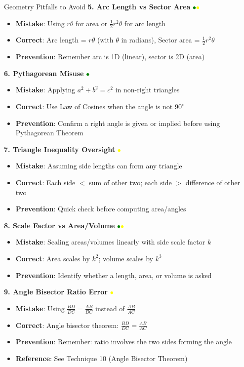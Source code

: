 \documentclass{article}
\begin{document}
\begin{trapbox}{Geometry Pitfalls to Avoid}
\textbf{5. Arc Length vs Sector Area} \textcolor{green}{$\bullet$}\textcolor{yellow}{$\bullet$}
\begin{itemize}[nosep]
\item \textbf{Mistake}: Using $r\theta$ for area or $\frac{1}{2}r^2\theta$ for arc length
\item \textbf{Correct}: Arc length = $r\theta$ (with $\theta$ in radians), Sector area = $\frac{1}{2}r^2\theta$
\item \textbf{Prevention}: Remember arc is 1D (linear), sector is 2D (area)
\end{itemize}
\textbf{6. Pythagorean Misuse} \textcolor{green}{$\bullet$}
\begin{itemize}[nosep]
\item \textbf{Mistake}: Applying $a^2+b^2=c^2$ in non-right triangles
\item \textbf{Correct}: Use Law of Cosines when the angle is not $90^\circ$
\item \textbf{Prevention}: Confirm a right angle is given or implied before using Pythagorean Theorem
\end{itemize}
\textbf{7. Triangle Inequality Oversight} \textcolor{yellow}{$\bullet$}
\begin{itemize}[nosep]
\item \textbf{Mistake}: Assuming side lengths can form any triangle
\item \textbf{Correct}: Each side $< $ sum of other two; each side $>$ difference of other two
\item \textbf{Prevention}: Quick check before computing area/angles
\end{itemize}
\textbf{8. Scale Factor vs Area/Volume} \textcolor{green}{$\bullet$}\textcolor{yellow}{$\bullet$}
\begin{itemize}[nosep]
\item \textbf{Mistake}: Scaling areas/volumes linearly with side scale factor $k$
\item \textbf{Correct}: Area scales by $k^2$; volume scales by $k^3$
\item \textbf{Prevention}: Identify whether a length, area, or volume is asked
\end{itemize}

\textbf{9. Angle Bisector Ratio Error} \textcolor{yellow}{$\bullet$}
\begin{itemize}[nosep]
\item \textbf{Mistake}: Using $\frac{BD}{DC} = \frac{AB}{BC}$ instead of $\frac{AB}{AC}$
\item \textbf{Correct}: Angle bisector theorem: $\frac{BD}{DC} = \frac{AB}{AC}$
\item \textbf{Prevention}: Remember: ratio involves the two sides forming the angle
\item \textbf{Reference}: See Technique 10 (Angle Bisector Theorem)
\end{itemize}


\end{trapbox}
\end{document}
